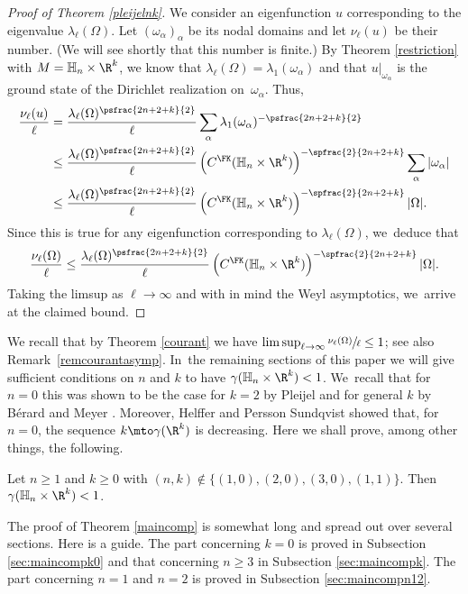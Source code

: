 \begin{proof}[Proof of Theorem \ref{pleijelnk}]
We consider an eigenfunction $u$ corresponding to the eigenvalue $\lambda_\ell(\Omega)$. Let $(\omega_\alpha)_\alpha$ be its nodal domains and let $\nu_\ell(u)$ be their number. (We will see shortly that this number is finite.) By Theorem \ref{restriction} with $M=\mathbb H_n\times\R^k$,
we know that $\lambda_\ell(\Omega) = \lambda_1(\omega_\alpha)$ and that $u|_{\omega_\alpha}$ is the ground state of the Dirichlet realization on~$\omega_\alpha$. Thus,
\begin{align*}
\frac{\nu_\ell(u)}{\ell} & = \frac{\lambda_\ell(\Omega)^{\psfrac{2n+2+k}{2}}}{\ell} \sum_\alpha \lambda_1(\omega_\alpha)^{-\psfrac{2n+2+k}{2}} \\
& \leq \frac{\lambda_\ell(\Omega)^{\psfrac{2n+2+k}{2}}}{\ell} \left(C^\FK(\mathbb H_n\times\R^k)\right)^{-\spfrac{2}{2n+2+k}} \sum_\alpha |\omega_\alpha| \\
& \leq \frac{\lambda_\ell(\Omega)^{\psfrac{2n+2+k}{2}}}{\ell} \left(C^\FK(\mathbb H_n\times\R^k)\right)^{-\spfrac{2}{2n+2+k}} |\Omega|.
\end{align*}
Since this is true for any eigenfunction corresponding to $\lambda_\ell(\Omega)$, we~deduce that
\[
\frac{\nu_\ell(\Omega)}{\ell} \leq \frac{\lambda_\ell(\Omega)^{\psfrac{2n+2+k}{2}}}{\ell} \left(C^\FK(\mathbb H_n\times\R^k)\right)^{-\spfrac{2}{2n+2+k}} |\Omega|.
\]
Taking the limsup as $\ell\to\infty$ and with in mind the Weyl asymptotics, we~arrive at the claimed bound.
\end{proof}

We recall that by Theorem \ref{courant} we have $\limsup_{\ell\to\infty} \sfrac{\nu_\ell(\Omega)}{\ell} \leq 1$; see also Remark~\ref{remcourantasymp}. In~the remaining sections of this paper we will give sufficient conditions on $n$ and $k$ to have $\gamma(\mathbb H_n\times\R^k)<1$. We~recall that for $n=0$ this was shown to be the case for $k=2$ by Pleijel \cite{Pl} and for general $k$ by Bérard and Meyer \cite{BerMe}. Moreover, Helffer and Persson Sundqvist \cite{HPS} showed that, for $n=0$, the sequence $k\mto\gamma(\R^k)$ is decreasing. Here we shall prove, among other things, the following.

\begin{theorem}\label{maincomp}
Let $n\geq 1$ and $k\geq 0$ with $(n,k)\not\in\{(1,0),(2,0),(3,0),(1,1)\}$. Then $\gamma(\mathbb H_n\times\R^k)<1$.
\end{theorem}

The proof of Theorem \ref{maincomp} is somewhat long and spread out over several sections. Here is a guide. The part concerning $k=0$ is proved in Subsection \ref{sec:maincompk0} and that concerning $n\geq 3$ in Subsection \ref{sec:maincompk}. The part concerning $n=1$ and $n=2$ is proved in Subsection \ref{sec:maincompn12}.

